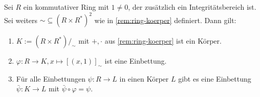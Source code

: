 \begin{theorem}\label{theorem:Quotientenkoerper}
    Sei $R$ ein kommutativer Ring mit $1 \neq 0$, der zusätzlich ein Integritätsbereich ist. Sei weiters $\sim \subseteq (R \times R^*)^2$ wie in \cref{rem:ring-koerper} definiert. Dann gilt:
    \begin{enumerate}
        \item $K := (R \times R^*)/_\sim $ mit $+, \cdot$ aus \cref{rem:ring-koerper} ist ein Körper.
        \item $\varphi : R \to K, x \mapsto [(x, 1)]_\sim$ ist eine Einbettung.
        \item Für alle Einbettungen $\psi : R \to L$ in einen Körper $L$ gibt es eine Einbettung $\bar{\psi} : K \to L$ mit $\bar{\psi} \circ \varphi = \psi$.
    \end{enumerate}
\end{theorem}

